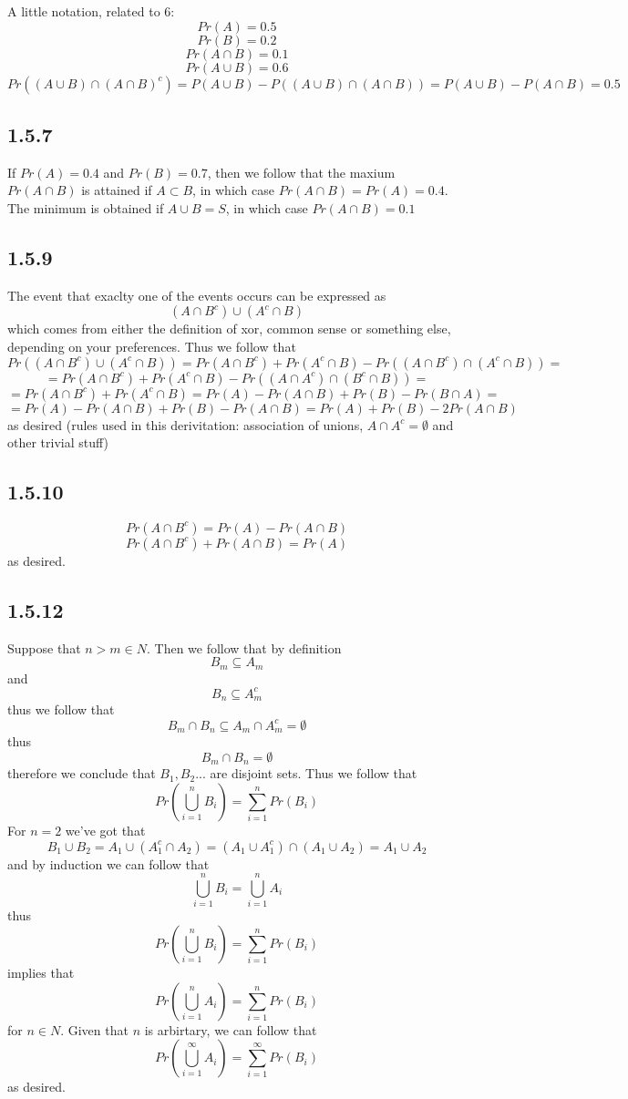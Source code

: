 \documentclass[11pt,oneside,titlepage]{book}
\begin{document}
A little notation, related to 6: 
$$Pr(A) = 0.5$$
$$Pr(B) = 0.2$$
$$Pr(A \cap B) = 0.1$$
$$Pr(A \cup B) = 0.6$$
$$Pr((A \cup B) \cap (A \cap B)^c) = P(A \cup B) - P((A \cup B) \cap (A \cap B)) =
P(A \cup B) - P(A \cap B) = 0.5$$

\subsection*{1.5.7}

If $Pr(A) = 0.4$ and $Pr(B) = 0.7$, then we follow that the maxium $Pr(A \cap B)$ is attained
if $A \subset B$, in which case $Pr(A \cap B) = Pr(A) = 0.4$. The minimum is obtained
if $A \cup B = S$, in which case $Pr(A \cap B) = 0.1$

\subsection*{1.5.9}

The event that exaclty one of the events occurs can be expressed as
$$(A \cap B^c) \cup (A^c \cap B)$$
which comes from either the definition of xor, common sense or something else, depending on
your preferences. Thus we follow that
$$Pr((A \cap B^c) \cup (A^c \cap B)) = Pr(A \cap B^c) + Pr(A^c \cap B) -
Pr((A \cap B^c) \cap (A^c \cap B)) = $$
$$ = 
Pr(A \cap B^c) + Pr(A^c \cap B) - Pr((A \cap A^c) \cap (B^c \cap B)) = $$
$$ =   Pr(A \cap B^c) + Pr(A^c \cap B) = Pr(A) - Pr(A \cap B) + Pr(B) - Pr(B \cap A) = $$
$$= Pr(A) - Pr(A \cap B) + Pr(B) - Pr(A \cap B) =  Pr(A) + Pr(B) - 2Pr(A \cap B)$$
as desired (rules used in this derivitation: association of unions, $A \cap A^c = \emptyset$
and other trivial stuff)

\subsection*{1.5.10}

$$Pr(A \cap B^c) = Pr(A) - Pr(A \cap B)$$
$$Pr(A \cap B^c) + Pr(A \cap B) = Pr(A) $$
as desired.

\subsection*{1.5.12}

Suppose that $n > m \in N$. Then we follow that by definition
$$B_m \subseteq A_m$$
and
$$B_n \subseteq A_m^c$$
thus we follow that
$$B_m \cap B_n \subseteq A_m \cap A_m^c = \emptyset$$
thus
$$B_m \cap B_n = \emptyset$$
therefore we conclude that $B_1, B_2 ...$ are disjoint sets. Thus we follow that
$$Pr(\bigcup_{i = 1}^n B_i) = \sum_{i = 1}^n {Pr(B_i)}$$
For $n = 2$ we've got that
$$B_1 \cup B_2 = A_1 \cup (A_1^c \cap A_2) = (A_1 \cup A_1^c) \cap (A_1 \cup A_2) = A_1 \cup A_2$$
and by induction we can follow that
$$\bigcup_{i = 1}^n {B_i} = \bigcup_{i = 1}^n {A_i}$$
thus
$$Pr(\bigcup_{i = 1}^n B_i) = \sum_{i = 1}^n {Pr(B_i)}$$
implies that
$$Pr(\bigcup_{i = 1}^n A_i) = \sum_{i = 1}^n {Pr(B_i)}$$
for $n \in N$. Given that $n$ is arbirtary, we can follow that
$$Pr(\bigcup_{i = 1}^\infty A_i) = \sum_{i = 1}^\infty {Pr(B_i)}$$
as desired.
\end{document}
